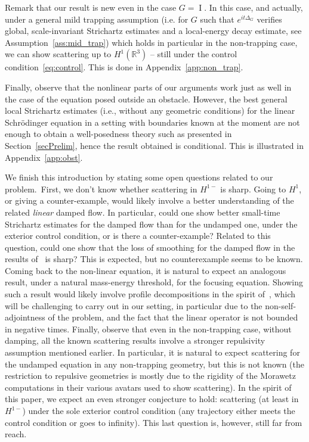 \documentclass[10pt]{amsart}
\theoremstyle{definition}\newtheorem{defi}[theo]{Definition}\newtheorem{rema}[theo]{Remark}\newtheorem{exam}[theo]{Example}\newtheorem{exem}[theo]{Example}\newtheorem{nota}[theo]{Notation}
\newcommand*\R{\mathbb{R}}
\DeclareMathOperator{\I}{I}
\begin{document}
Remark that our result is new even in the case $G = \I$. In this case, and actually, under a general mild trapping assumption (i.e. for $G$ such that $e^{it\Delta_G}$ verifies global, scale-invariant Strichartz estimates and a local-energy decay estimate, see Assumption~\ref{ass:mid_trap}) which holds in particular in the non-trapping case, we can show scattering up to $H^1(\R^3)$ -- still under the control condition~\eqref{eq:control}. This is done in Appendix~\ref{app:non_trap}.

Finally, observe that the nonlinear parts of our arguments work just as well in the case of the equation posed outside an obstacle. However, the best general local Strichartz estimates (i.e., without any geometric conditions) for the linear Schr{\"o}dinger equation in a setting with boundaries known at the moment are not enough to obtain a well-posedness theory such as presented in Section~\ref{secPrelim}, hence the result obtained is conditional. This is illustrated in Appendix~\ref{app:obst}.


We finish this introduction by stating some open questions related to our problem.~First, we don't know whether scattering in $H^{1-}$ is sharp. Going to $H^1$, or giving a counter-example, would likely involve a better understanding of the related \emph{linear} damped flow. In particular, could one show better small-time Strichartz estimates for the damped flow than for the undamped one, under the exterior control condition, or is there a counter-example? Related to this question, could one show that the loss of smoothing for the damped flow in the results of~\cite{AlKh07,AlKhRo17, KhRo17} is sharp? This is expected, but no counterexample seems to be known. Coming back to the non-linear equation, it is natural to expect an analogous result, under a natural mass-energy threshold, for the focusing equation. Showing such a result would likely involve profile decompositions in the spirit of~\cite{keMe06}, which will be challenging to carry out in our setting, in particular due to the non-self-adjointness of the problem, and the fact that the linear operator is not bounded in negative times. Finally, observe that even in the non-trapping case, without damping, all the known scattering results involve a stronger repulsivity assumption mentioned earlier. In particular, it is natural to expect scattering for the undamped equation in any non-trapping geometry, but this is not known (the restriction to repulsive geometries is mostly due to the rigidity of the Morawetz computations in their various avatars used to show scattering). In the spirit of this paper, we expect an even stronger conjecture to hold: scattering (at least in $H^{1-}$) under the sole exterior control condition (any trajectory either meets the control condition or goes to infinity). This last question is, however, still far from reach.
\end{document}
